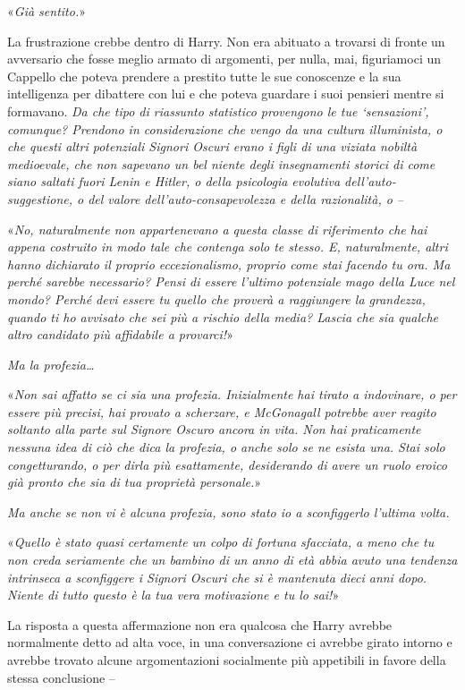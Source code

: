 «\textit{Già sentito.}»

La frustrazione crebbe dentro di Harry. Non era abituato a trovarsi di fronte un avversario che fosse meglio armato di argomenti, per nulla, mai, figuriamoci un Cappello che poteva prendere a prestito tutte le sue conoscenze e la sua intelligenza per dibattere con lui e che poteva guardare i suoi pensieri mentre si formavano. \textit{Da che tipo di riassunto statistico provengono le tue ‘sensazioni’, comunque? Prendono in considerazione che vengo da una cultura illuminista, o che questi altri potenziali Signori Oscuri erano i figli di una viziata nobiltà medioevale, che non sapevano un bel niente degli insegnamenti storici di come siano saltati fuori Lenin e Hitler, o della psicologia evolutiva dell’auto-suggestione, o del valore dell’auto-consapevolezza e della razionalità, o –}

«\textit{No, naturalmente non appartenevano a questa classe di riferimento che hai appena costruito in modo tale che contenga solo te stesso. E, naturalmente, altri hanno dichiarato il proprio eccezionalismo, proprio come stai facendo tu ora. Ma perché sarebbe necessario? Pensi di essere l’ultimo potenziale mago della Luce nel mondo? Perché devi essere tu quello che proverà a raggiungere la grandezza, quando ti ho avvisato che sei più a rischio della media? Lascia che sia qualche altro candidato più affidabile a provarci!}»

\textit{Ma la profezia…}

«\textit{Non sai affatto se ci sia una profezia. Inizialmente hai tirato a indovinare, o per essere più precisi, hai provato a scherzare, e McGonagall potrebbe aver reagito soltanto alla parte sul Signore Oscuro ancora in vita. Non hai praticamente nessuna idea di ciò che dica la profezia, o anche solo se ne esista una. Stai solo congetturando, o per dirla più esattamente, desiderando di avere un ruolo eroico già pronto che sia di tua proprietà personale.}»

\textit{Ma anche se non vi è alcuna profezia, sono stato io a sconfiggerlo l’ultima volta.}

«\textit{Quello è stato quasi certamente un colpo di fortuna sfacciata, a meno che tu non creda seriamente che un bambino di un anno di età abbia avuto una tendenza intrinseca a sconfiggere i Signori Oscuri che si è mantenuta dieci anni dopo. Niente di tutto questo è la tua vera motivazione e tu lo sai!}»

La risposta a questa affermazione non era qualcosa che Harry avrebbe normalmente detto ad alta voce, in una conversazione ci avrebbe girato intorno e avrebbe trovato alcune argomentazioni socialmente più appetibili in favore della stessa conclusione –


